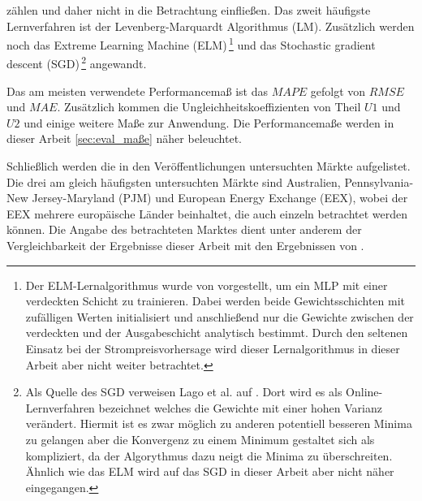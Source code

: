 zählen und daher nicht in die Betrachtung einfließen. Das zweit häufigste Lernverfahren ist der Levenberg-Marquardt Algorithmus (\gls{LM}). Zusätzlich werden noch das Extreme Learning Machine (\gls{ELM})\,\footnote{Der ELM-Lernalgorithmus wurde von \citet{Huang2004} vorgestellt, um ein MLP mit einer verdeckten Schicht zu trainieren. Dabei werden beide Gewichtsschichten mit zufälligen Werten initialisiert und anschließend nur die Gewichte zwischen der verdeckten und der Ausgabeschicht analytisch bestimmt. Durch den seltenen Einsatz bei der Strompreisvorhersage wird dieser Lernalgorithmus in dieser Arbeit aber nicht weiter betrachtet.} und das Stochastic gradient descent (\gls{SGD})\,\footnote{Als Quelle des \gls{SGD} verweisen Lago et al. auf \citet{Ruder2016}. Dort wird es als Online-Lernverfahren bezeichnet welches die Gewichte mit einer hohen Varianz verändert. Hiermit ist es zwar möglich zu anderen potentiell besseren Minima zu gelangen aber die Konvergenz zu einem Minimum gestaltet sich als kompliziert, da der Algorythmus dazu neigt die Minima zu überschreiten. Ähnlich wie das ELM wird auf das SGD in dieser Arbeit aber nicht näher eingegangen.} angewandt. 

Das am meisten verwendete Performancemaß ist das $MAPE$ gefolgt von $RMSE$ und $MAE$. Zusätzlich kommen die Ungleichheitskoeffizienten von Theil $U1$ und $U2$ und einige weitere Maße zur Anwendung. Die Performancemaße werden in dieser Arbeit  \autoref{sec:eval_maße} näher beleuchtet.

Schließlich werden die in den Veröffentlichungen untersuchten Märkte aufgelistet. Die drei am gleich häufigsten untersuchten Märkte sind Australien, Pennsylvania-New Jersey-Maryland (\gls{PJM}) und European Energy Exchange (\gls{EEX}), wobei der EEX mehrere europäische Länder beinhaltet, die auch einzeln betrachtet werden können. Die Angabe des betrachteten Marktes dient unter anderem der Vergleichbarkeit der Ergebnisse dieser Arbeit mit den Ergebnissen von \citet{Panapakidis2016}. 







